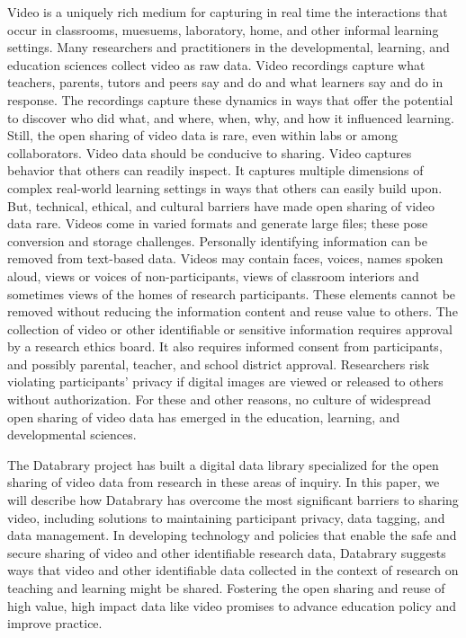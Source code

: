 \documentclass[letterpaper,man,apacite]{apa6}
\begin{document}
Video is a uniquely rich medium for capturing in real time the interactions that occur in classrooms, muesuems, laboratory, home, and other informal learning settings.
Many researchers and practitioners in the developmental, learning, and education sciences collect video as raw data.
Video recordings capture what teachers, parents, tutors and peers say and do and what learners say and do in response.
The recordings capture these dynamics in ways that offer the potential to discover who did what, and where, when, why, and how it influenced learning.
Still, the open sharing of video data is rare, even within labs or among collaborators.
Video data should be conducive to sharing.
Video captures behavior that others can readily inspect.
It captures multiple dimensions of complex real-world learning settings in ways that others can easily build upon. But, technical, ethical, and cultural barriers have made open sharing of video data rare.
Videos come in varied formats and generate large files; these pose conversion and storage challenges.
Personally identifying information can be removed from text-based data.
Videos may contain faces, voices, names spoken aloud, views or voices of non-participants, views of classroom interiors and sometimes views of the homes of research participants. 
These elements cannot be removed without reducing the information content and reuse value to others. 
The collection of video or other identifiable or sensitive information requires approval by a research ethics board.
It also requires informed consent from participants, and possibly parental, teacher, and school district approval.
Researchers risk violating participants’ privacy if digital images are viewed or released to others without authorization.
For these and other reasons, no culture of widespread open sharing of video data has emerged in the education, learning, and developmental sciences. 

The Databrary project has built a digital data library specialized for the open sharing of video data from research in these areas of inquiry.
In this paper, we will describe how Databrary has overcome the most significant barriers to sharing video, including solutions to maintaining participant privacy, data tagging, and data management.
In developing technology and policies that enable the safe and secure sharing of video and other identifiable research data, Databrary suggests ways that video and other identifiable data collected in the context of research on teaching and learning might be shared.
Fostering the open sharing and reuse of high value, high impact data like video promises to advance education policy and improve practice.
\end{document}

